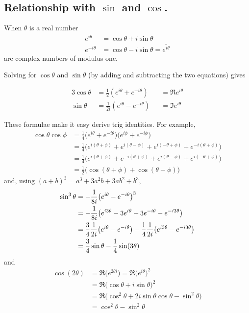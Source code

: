 \subsection{Relationship with $\sin$ and $\cos$.}\label{ssec complex sin cos}
\begin{impeqn}\label{eqn euler}
When $\theta$ is a real number
\begin{align*}
e^{i \theta} &= \cos \theta+i \sin \theta \\
e^{-i \theta} &= \cos \theta-i \sin \theta=\overline{e^{i\theta}}
\end{align*}
are complex numbers of modulus one.
\end{impeqn}
Solving for $\cos\theta$ and $\sin\theta$ (by adding and subtracting the two equations) gives
\begin{impeqn}\label{eqn exp sin cos}
\begin{alignat*}{3}
\cos\theta&=\frac{1}{2}(e^{i\theta}+e^{-i\theta})&&=\Re e^{i\theta} \\
\sin\theta&=\frac{1}{2i}(e^{i\theta}-e^{-i\theta})&&=\Im e^{i\theta}
\end{alignat*}
\end{impeqn}
 
\begin{eg}\label{eg complex trig id}
These formulae make it easy derive trig identities. For example,
\begin{align*}
\cos\theta\cos\phi &= \frac{1}{4}\big(e^{i\theta}+e^{-i\theta}\big)
                                 \big(e^{i\phi}+e^{-i\phi}\big) \\
 &= \frac{1}{4}\big(e^{i(\theta+\phi)}+e^{i(\theta-\phi)}
                    +e^{i(-\theta+\phi)}+e^{-i(\theta+\phi)}\big) \\
&= \frac{1}{4}\big(e^{i(\theta+\phi)}+e^{-i(\theta+\phi)}
           +e^{i(\theta-\phi)} +e^{i(-\theta+\phi)}\big) \\
&= \frac{1}{2}\big(\cos(\theta+\phi)+\cos(\theta-\phi)\big)
\end{align*}
and, using $(a+b)^3=a^3+3a^2b+3ab^2+b^3$,
\begin{align*}
\sin^3\theta&=-\frac{1}{8i}\big(e^{i\theta}-e^{-i\theta}\big)^3\cr
&=-\frac{1}{8i}\big(e^{i3\theta}-3e^{i\theta}
                +3e^{-i\theta}-e^{-i3\theta}\big) \\
&=\frac{3}{4}\frac{1}{2i}\big(e^{i\theta}-e^{-i\theta}\big)
-\frac{1}{4}\frac{1}{2i}\big(e^{i3\theta}-e^{-i3\theta}\big) \\
&=\frac{3}{4}\sin\theta-\frac{1}{4}\sin(3\theta)
\end{align*}
and
\begin{align*}
\cos(2\theta)&=\Re\big(e^{2\theta i}\big)=\Re \big(e^{i\theta}\big)^2 \\
&=\Re \big(\cos \theta+i\sin\theta\big)^2 \\
&=\Re \big(\cos^2 \theta+2i\sin\theta\cos\theta-\sin^2\theta\big) \\
&=\cos^2\theta-\sin^2\theta
\end{align*}
\end{eg}
